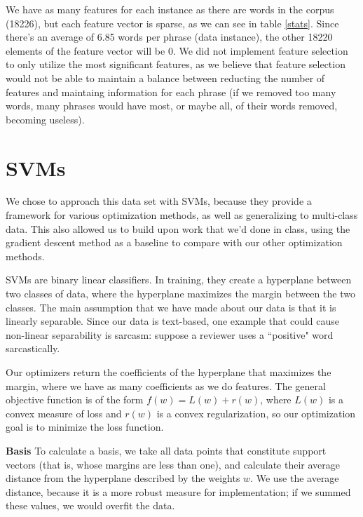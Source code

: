 \documentclass[letterpaper, 11pt]{article}
\begin{document}
We have as many features for each instance as there are words in the corpus (18226), but each feature vector is sparse, as we can see in table \ref{stats}.  Since there's an average of 6.85 words per phrase (data instance), the other 18220 elements of the feature vector will be 0.  We did not implement feature selection to only utilize the most significant features, as we believe that feature selection would not be able to maintain a balance between reducting the number of features and maintaing information for each phrase (if we removed too many words, many phrases would have most, or maybe all, of their words removed, becoming useless).

\section{SVMs}
We chose to approach this data set with SVMs, because they provide a framework for various optimization methods, as well as generalizing to multi-class data.  This also allowed us to build upon work that we'd done in class, using the gradient descent method as a baseline to compare with our other optimization methods.

SVMs are binary linear classifiers.  In training, they create a hyperplane between two classes of data, where the hyperplane maximizes the margin between the two classes.  The main assumption that we have made about our data is that it is linearly separable.  Since our data is text-based, one example that could cause non-linear separability is sarcasm: suppose a reviewer uses a ``positive" word sarcastically.

Our optimizers return the coefficients of the hyperplane that maximizes the margin, where we have as many coefficients as we do features.  The general objective function is of the form $f(w) = L(w) + r(w) $, where $L(w)$ is a convex measure of loss and $r(w)$ is a convex regularization, so our optimization goal is to minimize the loss function.

\textbf{Basis} To calculate a basis, we take all data points that constitute support vectors (that is, whose margins are less than one), and calculate their average distance from the hyperplane described by the weights $w$.  We use the average distance, because it is a more robust measure for implementation; if we summed these values, we would overfit the data. %
\end{document}
